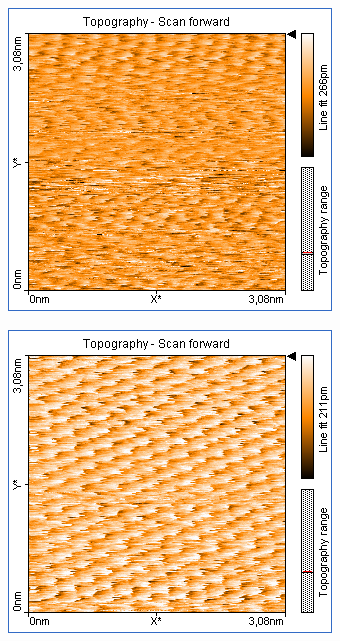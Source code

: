 \centering
\begin{figure}
    \begin{subfigure}[b]{\picwidth}
        \includegraphics[width=\textwidth]{data/Graphit/pic_06_13_3nm}
        \caption{}
        \label{fig:graphit_06_13}
    \end{subfigure}\qquad
    \begin{subfigure}[b]{\picwidth}
        \includegraphics[width=\textwidth]{data/Graphit/pic_06_14_3nm}

\end{subfigure}
\end{figure}

